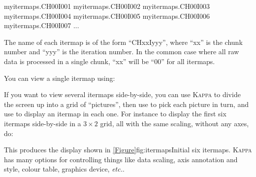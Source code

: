 \begin{terminalv}
\begin{terminalv}
myitermaps.CH00I001
myitermaps.CH00I002
myitermaps.CH00I003
myitermaps.CH00I004
myitermaps.CH00I005
myitermaps.CH00I006
myitermaps.CH00I007
...
\end{terminalv}

The name of each itermap is of the form ``CHxxIyyy'', where ``xx'' is the
chunk number and ``yyy'' is the iteration number. In the common case
where all raw data is processed in a single chunk, ``xx'' will be ``00''
for all itermaps.

You can view a single itermap using:
\begin{terminalv}
\end{terminalv}

If you want to view several itermaps side-by-side, you can use \textsc{Kappa}
 to divide the screen up into a grid
of ``pictures'', then use  to pick each
picture in turn, and use  to display
an itermap in each one. For instance to display the first six itermaps
side-by-side in a $3 \times 2$ grid, all with the same scaling, without
any axes, do:

\begin{terminalv}
\end{terminalv}

This produces the display shown in \cref{Figure}{fig:itermaps}{Initial
six itermaps}. \textsc{Kappa}  has
many options for controlling things like data scaling, axis annotation
and style, colour table, graphics device, \emph{etc.}.


\end{terminalv}
